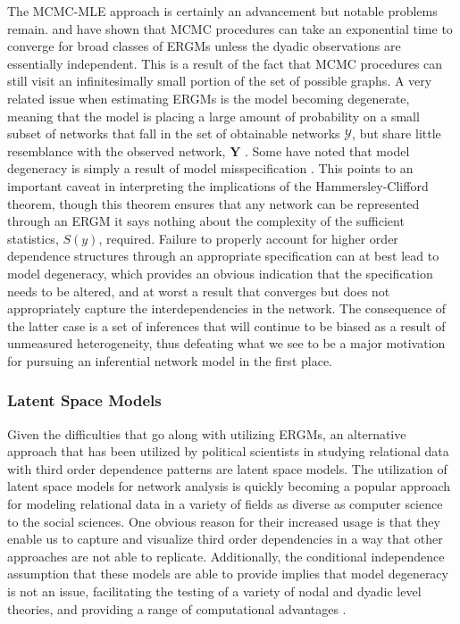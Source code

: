The MCMC-MLE approach is certainly an advancement but notable problems remain. \citet{bhamidi:etal:2008} and \citet{chatterjee:diaconis:2013} have shown that MCMC procedures can take an exponential time to converge for broad classes of ERGMs unless the dyadic observations are essentially independent. This is a result of the fact that MCMC procedures can still visit an infinitesimally small portion of the set of possible graphs. A very related issue when estimating ERGMs is the model becoming degenerate, meaning that the model is placing a large amount of probability on a small subset of networks that fall in the set of obtainable networks $\mathcal{Y}$, but share little resemblance with the observed network, $\mathbf{Y}$ \citep{schweinberger:2011}. Some have noted that model degeneracy is simply a result of model misspecification \citep{handcock:2003b,goodreau:etal:2008,handcock:etal:2008}. This points to an important caveat in interpreting the implications of the Hammersley-Clifford theorem, though this theorem ensures that any network can be represented through an ERGM it says nothing about the complexity of the sufficient statistics, $S(y)$, required. Failure to properly account for higher order dependence structures through an appropriate specification can at best lead to model degeneracy, which provides an obvious indication that the specification needs to be altered, and at worst a result that converges but does not appropriately capture the interdependencies in the network. The consequence of the latter case is a set of inferences that will continue to be biased as a result of unmeasured heterogeneity, thus defeating what we see to be a major motivation for pursuing an inferential network model in the first place. 

\subsubsection{\textbf{Latent Space Models}}

Given the difficulties that go along with utilizing ERGMs, an alternative approach that has been utilized by political scientists in studying relational data with third order dependence patterns are latent space models. The utilization of latent space models for network analysis is quickly becoming a popular approach for modeling relational data in a variety of fields as diverse as computer science to the social sciences. One obvious reason for their increased usage is that they enable us to capture and visualize third order dependencies in a way that other approaches are not able to replicate. Additionally, the conditional independence assumption that these models are able to provide implies that model degeneracy is not an issue, facilitating the testing of a variety of nodal and dyadic level theories, and providing a range of computational advantages \citep{hunter:etal:2012}. 

